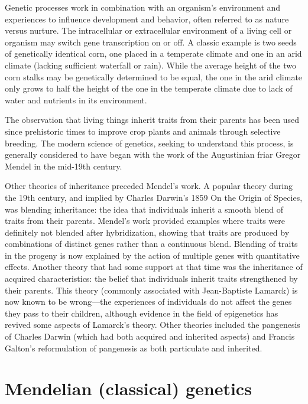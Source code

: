 Genetic processes work in combination with an organism's environment and experiences to influence development and behavior, often referred to as nature versus nurture. The intracellular or extracellular environment of a living cell or organism may switch gene transcription on or off. A classic example is two seeds of genetically identical corn, one placed in a temperate climate and one in an arid climate (lacking sufficient waterfall or rain). While the average height of the two corn stalks may be genetically determined to be equal, the one in the arid climate only grows to half the height of the one in the temperate climate due to lack of water and nutrients in its environment.

The observation that living things inherit traits from their parents has been used since prehistoric times to improve crop plants and animals through selective breeding. The modern science of genetics, seeking to understand this process, is generally considered to have began with the work of the Augustinian friar Gregor Mendel in the mid-19th century.

Other theories of inheritance preceded Mendel's work. A popular theory during the 19th century, and implied by Charles Darwin's 1859 On the Origin of Species, was blending inheritance: the idea that individuals inherit a smooth blend of traits from their parents. Mendel's work provided examples where traits were definitely not blended after hybridization, showing that traits are produced by combinations of distinct genes rather than a continuous blend. Blending of traits in the progeny is now explained by the action of multiple genes with quantitative effects. Another theory that had some support at that time was the inheritance of acquired characteristics: the belief that individuals inherit traits strengthened by their parents. This theory (commonly associated with Jean-Baptiste Lamarck) is now known to be wrong---the experiences of individuals do not affect the genes they pass to their children, although evidence in the field of epigenetics has revived some aspects of Lamarck's theory. Other theories included the pangenesis of Charles Darwin (which had both acquired and inherited aspects) and Francis Galton's reformulation of pangenesis as both particulate and inherited.

\hypertarget{mendelian-classical-genetics}{%
\section{Mendelian (classical) genetics}\label{mendelian-classical-genetics}}

